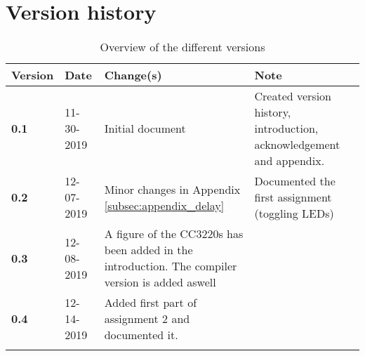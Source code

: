 \section*{Version history}


\begin{longtable}{| p{} | p{} | p{} | p{} |}

    \hline
    \textcolor{darkpink}{Version} & \textcolor{darkpink}{Date} & \textcolor{darkpink}{Change(s)} & \textcolor{darkpink}{Note} \\
     
    \hline
    \textbf{0.1} & 11-30-2019 & Initial document & Created version history, introduction, acknowledgement and appendix. \\

    \hline

    \textbf{0.2} & 12-07-2019 & Minor changes in Appendix \ref{subsec:appendix_delay} & Documented the first assignment (toggling LEDs) \\

    \hline

    \textbf{0.3} & 12-08-2019 & A figure of the CC3220s has been added in the introduction. The compiler version is added aswell & \\
    \hline

    \textbf{0.4} & 12-14-2019 & Added first part of assignment 2 and documented it. & \\

    \hline

    \caption{Overview of the different versions}
    \label{tab:version}

\end{longtable}
